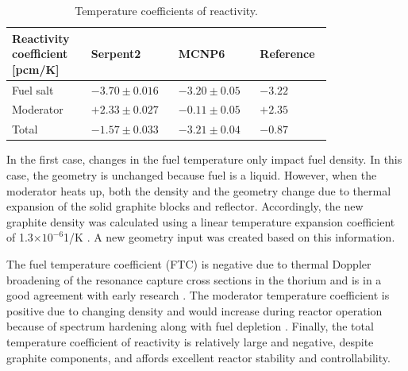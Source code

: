 \documentclass{anstrans}
\begin{document}
\captionsetup[table]{
  labelsep = newline,
  name = TABLE, 
  justification=justified,
  singlelinecheck=false,%
  labelsep=colon,%
  skip = \medskipamount}
\begin{table}[h!]
  \caption{Temperature coefficients of reactivity.}
\begin{tabular}{p{0.22\linewidth} p{0.22\linewidth} p{0.21\linewidth} p{0.15\linewidth}} \toprule
   Reactivity coefficient [pcm/K]  & Serpent2      & MCNP6 \cite{park_whole_2015}   & Reference \cite{robertson_conceptual_1971}      
\\ \midrule
Fuel salt        & $-3.70\pm0.016$ & $-3.20\pm0.05$ & $-3.22$ 
\\ \midrule
Moderator        & $+2.33\pm0.027$ & $-0.11\pm0.05$ & $+2.35$ 
\\ \midrule
Total            & $-1.57\pm0.033$ & $-3.21\pm0.04$ & $-0.87$ 
\\
\bottomrule
\end{tabular}
  \label{tab:tcoef}
\end{table}
In the first case, changes in the fuel temperature only impact fuel density. In 
this case, the geometry is unchanged because fuel is a liquid. However, when 
the moderator heats up, both the density and the geometry change due to thermal 
expansion of the solid graphite blocks and reflector. Accordingly, the new 
graphite density was calculated using a linear temperature expansion 
coefficient of 1.3$\times10^{-6}$1/K \cite{robertson_conceptual_1971}. A new 
geometry input was created based on this information.

The fuel temperature coefficient (FTC) is negative due to thermal Doppler 
broadening of the resonance capture cross sections in the thorium and is in a 
good agreement with early research 
\cite{robertson_conceptual_1971,park_whole_2015}. The moderator temperature 
coefficient is positive due to changing density and would increase during reactor operation because of spectrum hardening along with fuel depletion \cite{park_whole_2015}. Finally, the total temperature coefficient of reactivity is relatively large and negative, despite graphite components, and affords excellent reactor stability and controllability.
\end{document}
